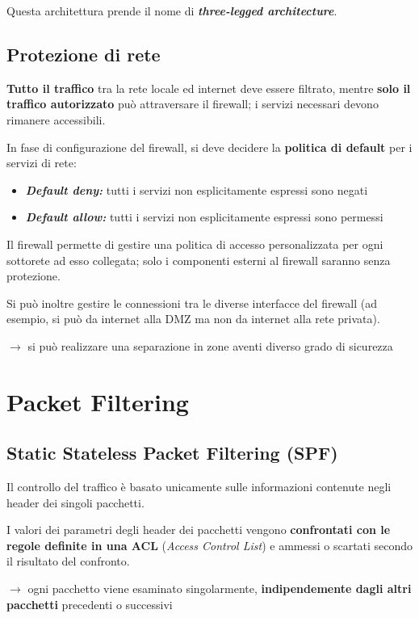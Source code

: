 \noindent Questa architettura prende il nome di \textbf{\textit{three-legged architecture}}.

\subsection{Protezione di rete}
\textbf{Tutto il traffico} tra la rete locale ed internet deve essere filtrato, mentre 
\textbf{solo il traffico autorizzato} può attraversare il firewall; i servizi 
necessari devono rimanere accessibili.

\noindent In fase di configurazione del firewall, si deve decidere la 
\textbf{politica di default} per i servizi di rete:
\begin{itemize}
    \item \textbf{\textit{Default deny:}} tutti i servizi non esplicitamente espressi sono negati 
    \item \textbf{\textit{Default allow:}} tutti i servizi non esplicitamente espressi sono permessi 
\end{itemize}

\noindent Il firewall permette di gestire una politica di accesso personalizzata per 
ogni sottorete ad esso collegata; solo i componenti esterni al firewall saranno 
senza protezione.

\noindent Si può inoltre gestire le connessioni tra le diverse interfacce del firewall 
(ad esempio, si può da internet alla DMZ ma non da internet alla rete privata).

$\rightarrow$ si può realizzare una separazione in zone aventi diverso grado di sicurezza 

\section{Packet Filtering}

\subsection{Static Stateless Packet Filtering (SPF)}
Il controllo del traffico è basato unicamente sulle informazioni contenute 
negli header dei singoli pacchetti.

\noindent I valori dei parametri degli header dei pacchetti vengono \textbf{confrontati 
con le regole definite in una ACL} (\textit{Access Control List}) e ammessi o scartati 
secondo il risultato del confronto.

$\rightarrow$ ogni pacchetto viene esaminato singolarmente, \textbf{indipendemente dagli altri pacchetti} precedenti 
o successivi

